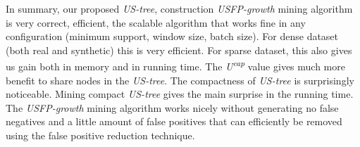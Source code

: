 \documentclass[conference]{IEEEtran}
\begin{document}

In summary, our proposed \emph{US-tree}, construction \emph{USFP-growth} mining algorithm is very correct, efficient, the scalable algorithm that works fine in any configuration (minimum support, window size, batch size). For dense dataset (both real and synthetic) this is very efficient. For sparse dataset, this also gives us gain both in memory and in running time. The \emph{U\textsuperscript{cap}} value gives much more benefit to share nodes in the \emph{US-tree}. The compactness of \emph{US-tree} is surprisingly noticeable. Mining compact \emph{US-tree} gives the main surprise in the running time. The \emph{USFP-growth} mining algorithm works nicely without generating no false negatives and a little amount of false positives that can efficiently be removed using the false positive reduction technique.
\end{document}
